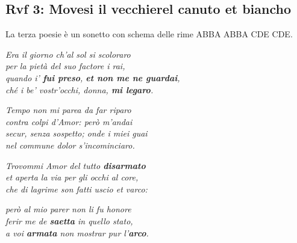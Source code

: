 \documentclass[a4paper]{article}
\begin{document}
\subsection{Rvf 3: Movesi il vecchierel canuto et biancho}

La terza poesie è un sonetto con schema delle rime ABBA ABBA CDE CDE.

\begin{center}
    \textit{Era il giorno ch'al sol si scoloraro} \\
    \textit{per la pietà del suo factore i rai,} \\
    \textit{quando i' \textbf{fui preso}, \textbf{et non me ne guardai},} \\
    \textit{ché i be' vostr'occhi, donna, \textbf{mi legaro}.}
\end{center}
\begin{center}
    \textit{Tempo non mi parea da far riparo} \\
    \textit{contra colpi d'Amor: però m'andai} \\
    \textit{secur, senza sospetto; onde i miei guai} \\
    \textit{nel commune dolor s'incominciaro.}
\end{center}
\begin{center}
    \textit{Trovommi Amor del tutto \textbf{disarmato}} \\
    \textit{et aperta la via per gli occhi al core,} \\
    \textit{che di lagrime son fatti uscio et varco:}
\end{center}
\begin{center}
    \textit{però al mio parer non li fu honore} \\
    \textit{ferir me de \textbf{saetta} in quello stato,} \\
    \textit{a voi \textbf{armata} non mostrar pur l'\textbf{arco}.}
\end{center}
\end{document}
